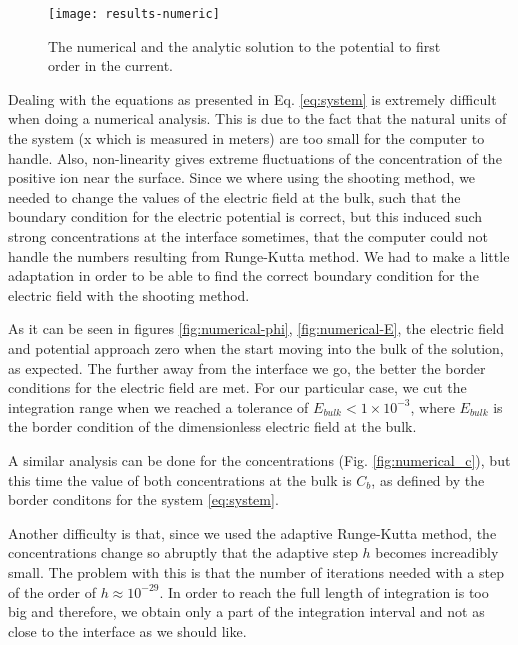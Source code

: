 \begin{figure}[htbp]
 \centering
\texttt{[image: results-numeric]}
 \caption{The numerical and the analytic solution to the potential to first order in the current.}
 \label{fig:numeric-results}
\end{figure}

Dealing with the equations as presented in Eq. \ref{eq:system} is extremely difficult when doing a numerical analysis. This is due to the fact that the natural units of the system (x which is measured in meters) are too small for the computer to handle. Also, non-linearity gives extreme fluctuations of the concentration of the positive ion near the surface. Since we where using the shooting method, we needed to change the values of the electric field at the bulk, such that the boundary condition for the electric potential is correct, but this induced such strong concentrations at the interface sometimes, that the computer could not handle the numbers resulting from Runge-Kutta method. We had to make a little adaptation in order to be able to find the correct boundary condition for the electric field with the shooting method. 




As it can be seen in figures  \ref{fig:numerical-phi},  \ref{fig:numerical-E}, the electric field and potential approach zero when the start moving into the bulk of the solution, as expected. The further away from the interface we go, the better the border conditions for the electric field are met. For our particular case, we cut the integration range when we reached a tolerance of $ E_{bulk} < 1\times 10^{-3}$, where $E_{bulk}$ is the border condition of the dimensionless electric field at the bulk. 



A similar analysis can be done for the concentrations (Fig.  \ref{fig:numerical_c}), but this time the value of both concentrations at the bulk is $C_b$, as defined by the border conditons for the system \ref{eq:system}.



Another difficulty is that, since we used the adaptive Runge-Kutta method, the concentrations change so abruptly that the adaptive step $h$ becomes increadibly small. The problem with this is that the number of iterations needed with a step of the order of $h\approx 10^{-29}$. In order to reach the full length of integration is too big and therefore, we obtain only a part of the integration interval and not as close to the interface as we should like. 


